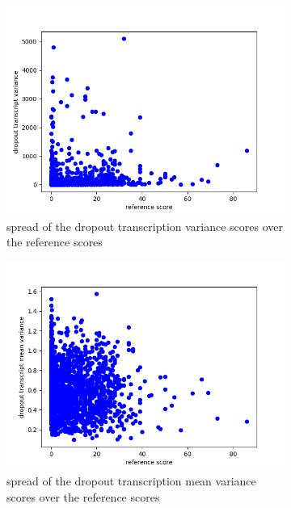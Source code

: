 \begin{figure}[h]
\begin{subfigure}{0.4\linewidth}
        \includegraphics[width=\textwidth]{Latex/sections/images/seamlessdropouttranscriptvar.png}
        \caption{spread of the dropout transcription variance scores over the reference scores}
    \end{subfigure}
    \begin{subfigure}{0.4\linewidth}
        \includegraphics[width=\textwidth]{Latex/sections/images/seamlessdropouttranscriptmeanvar.png}
        \caption{spread of the dropout transcription mean variance scores over the reference scores}
    \end{subfigure}
    \begin{subfigure}{0.4\linewidth}

\end{subfigure}
\end{figure}
